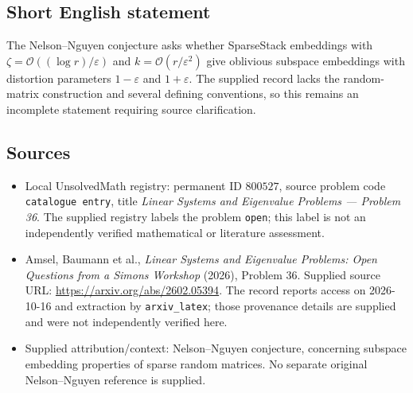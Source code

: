 \documentclass[11pt]{article}
\begin{document}
\subsection{Short English statement}
The Nelson--Nguyen conjecture asks whether SparseStack embeddings with \(\zeta=\mathcal O((\log r)/\varepsilon)\) and \(k=\mathcal O(r/\varepsilon^2)\) give oblivious subspace embeddings with distortion parameters \(1-\varepsilon\) and \(1+\varepsilon\). The supplied record lacks the random-matrix construction and several defining conventions, so this remains an incomplete statement requiring source clarification.
\subsection{Sources}
\begin{itemize}
\item Local UnsolvedMath registry: permanent ID \(800527\), source problem code \texttt{catalogue entry}, title \emph{Linear Systems and Eigenvalue Problems --- Problem 36}. The supplied registry labels the problem \texttt{open}; this label is not an independently verified mathematical or literature assessment.
\item Amsel, Baumann et al., \emph{Linear Systems and Eigenvalue Problems: Open Questions from a Simons Workshop} (2026), Problem 36. Supplied source URL: \url{https://arxiv.org/abs/2602.05394}. The record reports access on 2026-10-16 and extraction by \texttt{arxiv\_latex}; those provenance details are supplied and were not independently verified here.
\item Supplied attribution/context: Nelson--Nguyen conjecture, concerning subspace embedding properties of sparse random matrices. No separate original Nelson--Nguyen reference is supplied.
\end{itemize}
\end{document}
